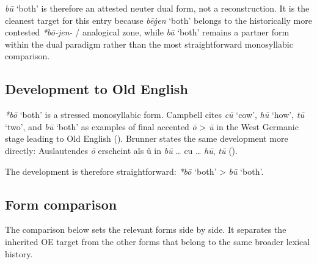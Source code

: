 \documentclass[
  british,
  a4paper,
  openany]{book}
\begin{document}
{\emph{bū}} `both' is therefore an attested neuter dual form, not a
reconstruction. It is the cleanest target for this entry because
{\emph{bēġen}} `both' belongs to the historically more contested
\emph{*bō-jen-} / analogical zone, while \emph{bā} `both' remains a
partner form within the dual paradigm rather than the most
straightforward monosyllabic comparison.

\subsection{Development to Old
English}\label{development-to-old-english-7}

{\emph{*bō}} `both' is a stressed monosyllabic form. Campbell cites
\emph{cū} `cow', \emph{hū} `how', \emph{tū} `two', and {\emph{bū}}
`both' as examples of final accented \emph{ō} \textgreater{} \emph{ū} in
the West Germanic stage leading to Old English
(). Brunner states
the same development more directly: Auslautendes \emph{ō} erscheint als
û in \emph{bū} \ldots{} cu \ldots{} \emph{hū}, \emph{tū}
().

The development is therefore straightforward: {\emph{*bō}} `both'
\textgreater{} {\emph{bū}} `both'.

\subsection{Form comparison}\label{form-comparison}

The comparison below sets the relevant forms side by side. It separates
the inherited OE target from the other forms that belong to the same
broader lexical history.
\end{document}
